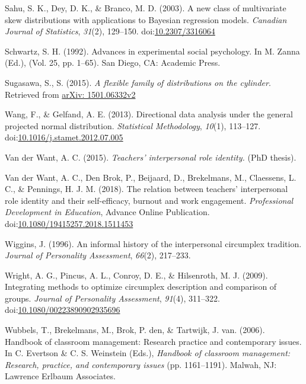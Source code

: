 \documentclass[man]{apa6}
\DeclareRobustCommand{\VANDER}[3]{#2}
\theoremstyle{definition}
\theoremstyle{definition}
\theoremstyle{definition}
\theoremstyle{remark}
\begin{document}
\leavevmode\hypertarget{ref-sahu2003new}{}%
Sahu, S. K., Dey, D. K., \& Branco, M. D. (2003). A new class of
multivariate skew distributions with applications to Bayesian regression
models. \emph{Canadian Journal of Statistics}, \emph{31}(2), 129--150.
doi:\href{https://doi.org/10.2307/3316064}{10.2307/3316064}

\leavevmode\hypertarget{ref-schwartz1992values}{}%
Schwartz, S. H. (1992). Advances in experimental social psychology. In
M. Zanna (Ed.), (Vol. 25, pp. 1--65). San Diego, CA: Academic Press.

\leavevmode\hypertarget{ref-sugasawa2015flexible}{}%
Sugasawa, S., S. (2015). \emph{A flexible family of distributions on the
cylinder}. Retrieved from
\href{arXiv:\%201501.06332v2}{arXiv: 1501.06332v2}

\leavevmode\hypertarget{ref-wang2012directional}{}%
Wang, F., \& Gelfand, A. E. (2013). Directional data analysis under the
general projected normal distribution. \emph{Statistical Methodology},
\emph{10}(1), 113--127.
doi:\href{https://doi.org/10.1016/j.stamet.2012.07.005}{10.1016/j.stamet.2012.07.005}

\leavevmode\hypertarget{ref-vanderWant2015role}{}%
\VANDER{Want}{Van der}{van der} Want, A. C. (2015). \emph{Teachers'
interpersonal role identity.} (PhD thesis).

\leavevmode\hypertarget{ref-want2018selfefficacy}{}%
\VANDER{Want}{Van der}{van der} Want, A. C., Den Brok, P., Beijaard, D.,
Brekelmans, M., Claessens, L. C., \& Pennings, H. J. M. (2018). The
relation between teachers' interpersonal role identity and their
self-efficacy, burnout and work engagement. \emph{Professional
Development in Education}, Advance Online Publication.
doi:\href{https://doi.org/10.1080/19415257.2018.1511453}{10.1080/19415257.2018.1511453}

\leavevmode\hypertarget{ref-wiggins1996history}{}%
Wiggins, J. (1996). An informal history of the interpersonal circumplex
tradition. \emph{Journal of Personality Assessment}, \emph{66}(2),
217--233.

\leavevmode\hypertarget{ref-wright2009integrating}{}%
Wright, A. G., Pincus, A. L., Conroy, D. E., \& Hilsenroth, M. J.
(2009). Integrating methods to optimize circumplex description and
comparison of groups. \emph{Journal of Personality Assessment},
\emph{91}(4), 311--322.
doi:\href{https://doi.org/10.1080/00223890902935696}{10.1080/00223890902935696}

\leavevmode\hypertarget{ref-wubbels2006interpersonal}{}%
Wubbels, T., Brekelmans, M., Brok, P. den, \& Tartwijk, J. van. (2006).
Handbook of classroom management: Research practice and contemporary
issues. In C. Evertson \& C. S. Weinstein (Eds.), \emph{Handbook of
classroom management: Research, practice, and contemporary issues} (pp.
1161--1191). Malwah, NJ: Lawrence Erlbaum Associates.
\end{document}
